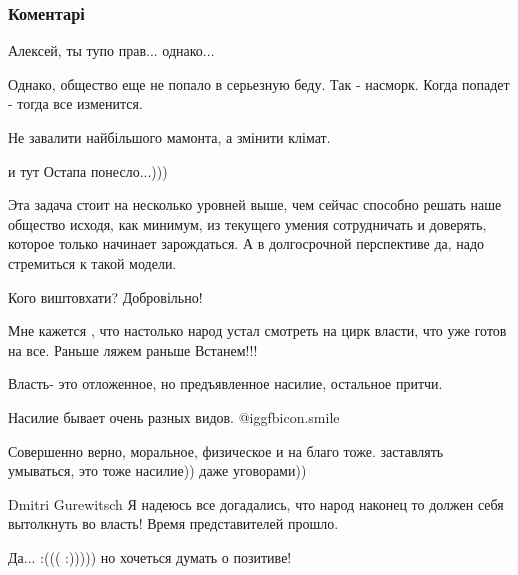  
 
 
 
 
\subsubsection{Коментарі}
\label{sec:30_12_2013.fb.arestovich_alexei.1.sede_vacante.cmt}

\begin{itemize} %
Алексей, ты тупо прав... однако...


Однако, общество еще не попало в серьезную беду. Так - насморк.
Когда попадет - тогда все изменится.

Не завалити найбільшого мамонта, а змінити клімат.

и тут Остапа понесло...)))


Эта задача стоит на несколько уровней выше, чем сейчас способно решать наше
общество исходя, как минимум, из текущего умения сотрудничать и доверять,
которое только начинает зарождаться. А в долгосрочной перспективе да, надо
стремиться к такой модели.

Кого виштовхати? Добровільно!

Мне кажется , что настолько народ устал смотреть на цирк власти, что уже готов на все. Раньше ляжем раньше Встанем!!!


Власть- это отложенное, но предъявленное насилие, остальное притчи.

Насилие бывает очень разных видов. @igg{fbicon.smile} 

Совершенно верно, моральное, физическое и на благо тоже. заставлять умываться, это тоже насилие)) даже уговорами))

Dmitri Gurewitsch
Я надеюсь все догадались, что народ наконец то должен себя вытолкнуть во власть! Время представителей прошло.

Да... :((( :))))) но хочеться думать о позитиве!


\end{itemize}
